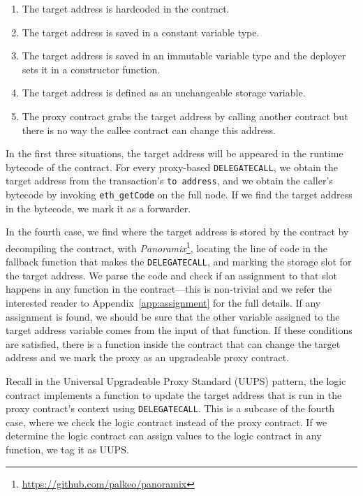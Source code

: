 \begin{enumerate}
  \item The target address is hardcoded in the contract.
  \item The target address is saved in a constant variable type.
  \item The target address is saved in an immutable variable type and the deployer sets it in a constructor function.
  \item The target address is defined as an unchangeable storage variable.
  \item The proxy contract grabs the target address by calling another contract but there is no way the callee contract can change this address.
\end{enumerate}

In the first three situations, the target address will be appeared in the runtime bytecode of the contract. For every proxy-based \texttt{DELEGATECALL}, we obtain the target address from the transaction's \texttt{to address}, and we obtain the caller's bytecode by invoking \texttt{eth\_getCode} on the full node. If we find the target address in the bytecode, we mark it as a forwarder. 

In the fourth case, we find where the target address is stored by the contract by decompiling the contract, with \textit{Panoramix}\footnote{\url{https://github.com/palkeo/panoramix}}, locating the line of code in the fallback function that makes the \texttt{DELEGATECALL}, and marking the storage slot for the target address. We parse the code and check if an assignment to that slot happens in any function in the contract---this is non-trivial and we refer the interested reader to Appendix~\ref{app:assignment} for the full details. If any assignment is found, we should be sure that the other variable assigned to the target address variable comes from the input of that function. If these conditions are satisfied, there is a function inside the contract that can change the target address and we mark the proxy as an upgradeable proxy contract. 

Recall in the Universal Upgradeable Proxy Standard (UUPS) pattern, the logic contract implements a function to update the target address that is run in the proxy contract's context using \texttt{DELEGATECALL}. This is a subcase of the fourth case, where we check the logic contract instead of the proxy contract. If we determine the logic contract can assign values to the logic contract in any function, we tag it as UUPS.

